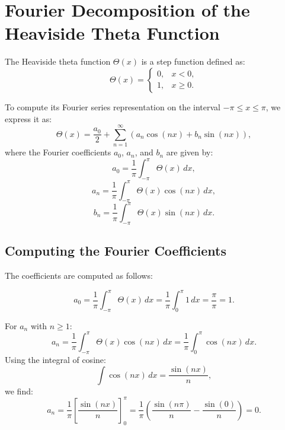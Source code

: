 % 
%
\section{Fourier Decomposition of the Heaviside Theta Function}

The Heaviside theta function \( \Theta(x) \) is a step function defined as:
\begin{equation}
\Theta(x) =
\begin{cases}
0, & x < 0, \\
1, & x \geq 0.
\end{cases}
\label{eq:theta-definition}
\end{equation}

To compute its Fourier series representation on the interval \( -\pi \leq x \leq \pi \), we express it as:
\begin{equation}
\Theta(x) = \frac{a_0}{2} + \sum_{n=1}^\infty \left(a_n \cos(nx) + b_n \sin(nx)\right),
\label{eq:fourier-series}
\end{equation}
where the Fourier coefficients \( a_0 \), \( a_n \), and \( b_n \) are given by:
\begin{equation}
a_0 = \frac{1}{\pi} \int_{-\pi}^\pi \Theta(x) \, dx,
\label{eq:a0-definition}
\end{equation}
\begin{equation}
a_n = \frac{1}{\pi} \int_{-\pi}^\pi \Theta(x) \cos(nx) \, dx,
\label{eq:an-definition}
\end{equation}
\begin{equation}
b_n = \frac{1}{\pi} \int_{-\pi}^\pi \Theta(x) \sin(nx) \, dx.
\label{eq:bn-definition}
\end{equation}

\subsection{Computing the Fourier Coefficients}

The coefficients are computed as follows:

\begin{equation}
a_0 = \frac{1}{\pi} \int_{-\pi}^\pi \Theta(x) \, dx = \frac{1}{\pi} \int_0^\pi 1 \, dx = \frac{\pi}{\pi} = 1.
\label{eq:a0-result}
\end{equation}

For \( a_n \) with \( n \geq 1 \):
\begin{equation}
a_n = \frac{1}{\pi} \int_{-\pi}^\pi \Theta(x) \cos(nx) \, dx = \frac{1}{\pi} \int_0^\pi \cos(nx) \, dx.
\label{eq:an-step}
\end{equation}
Using the integral of cosine:
\begin{equation}
\int \cos(nx) \, dx = \frac{\sin(nx)}{n},
\label{eq:cosine-integral}
\end{equation}
we find:
\begin{equation}
a_n = \frac{1}{\pi} \left[ \frac{\sin(nx)}{n} \right]_0^\pi = \frac{1}{\pi} \left( \frac{\sin(n\pi)}{n} - \frac{\sin(0)}{n} \right) = 0.
\label{eq:an-result}
\end{equation}

